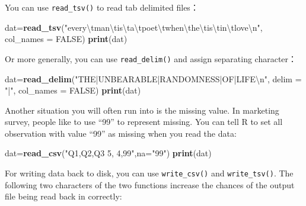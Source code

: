 \documentclass[12pt,]{krantz}
\makeatletter
\newenvironment{Shaded}{\begin{snugshade}}{\end{snugshade}}
\newcommand{\KeywordTok}[1]{\textcolor[rgb]{0.27,0.27,0.27}{\textbf{#1}}}
\newcommand{\DataTypeTok}[1]{\textcolor[rgb]{0.27,0.27,0.27}{#1}}
\newcommand{\CharTok}[1]{\textcolor[rgb]{0.5,0.5,0.5}{#1}}
\newcommand{\StringTok}[1]{\textcolor[rgb]{0.5,0.5,0.5}{#1}}
\newcommand{\OtherTok}[1]{\textcolor[rgb]{0.37,0.37,0.37}{#1}}
\newcommand{\NormalTok}[1]{#1}
\newenvironment{kframe}{%
\medskip{}
\setlength{\fboxsep}{.8em}
 \def\at@end@of@kframe{}%
 \ifinner\ifhmode%
  \def\at@end@of@kframe{\end{minipage}}%
  \begin{minipage}{\columnwidth}%
 \fi\fi%
 \def\FrameCommand##1{\hskip\@totalleftmargin \hskip-\fboxsep
 \colorbox{shadecolor}{##1}\hskip-\fboxsep
     \hskip-\linewidth \hskip-\@totalleftmargin \hskip\columnwidth}%
 \MakeFramed {\advance\hsize-\width
   \@totalleftmargin\z@ \linewidth\hsize
   \@setminipage}}%
 {\par\unskip\endMakeFramed%
 \at@end@of@kframe}
\renewenvironment{Shaded}{\begin{kframe}}{\end{kframe}}
\theoremstyle{definition}
\theoremstyle{definition}
\theoremstyle{definition}
\theoremstyle{remark}
\makeatother
\begin{document}
You can use \texttt{read\_tsv()} to read tab delimited files：

\begin{Shaded}
\begin{Highlighting}[]
\NormalTok{dat=}\KeywordTok{read_tsv}\NormalTok{(}\StringTok{"every}\CharTok{\textbackslash{}t}\StringTok{man}\CharTok{\textbackslash{}t}\StringTok{is}\CharTok{\textbackslash{}t}\StringTok{a}\CharTok{\textbackslash{}t}\StringTok{poet}\CharTok{\textbackslash{}t}\StringTok{when}\CharTok{\textbackslash{}t}\StringTok{he}\CharTok{\textbackslash{}t}\StringTok{is}\CharTok{\textbackslash{}t}\StringTok{in}\CharTok{\textbackslash{}t}\StringTok{love}\CharTok{\textbackslash{}n}\StringTok{"}\NormalTok{, }\DataTypeTok{col_names =} \OtherTok{FALSE}\NormalTok{)}
\KeywordTok{print}\NormalTok{(dat)}
\end{Highlighting}
\end{Shaded}

Or more generally, you can use \texttt{read\_delim()} and assign
separating character：

\begin{Shaded}
\begin{Highlighting}[]
\NormalTok{dat=}\KeywordTok{read_delim}\NormalTok{(}\StringTok{"THE|UNBEARABLE|RANDOMNESS|OF|LIFE}\CharTok{\textbackslash{}n}\StringTok{"}\NormalTok{, }\DataTypeTok{delim =} \StringTok{"|"}\NormalTok{, }\DataTypeTok{col_names =} \OtherTok{FALSE}\NormalTok{)}
\KeywordTok{print}\NormalTok{(dat)}
\end{Highlighting}
\end{Shaded}

Another situation you will often run into is the missing value. In
marketing survey, people like to use ``99'' to represent missing. You
can tell R to set all observation with value ``99'' as missing when you
read the data:

\begin{Shaded}
\begin{Highlighting}[]
\NormalTok{dat=}\KeywordTok{read_csv}\NormalTok{(}\StringTok{"Q1,Q2,Q3}
\StringTok{               5, 4,99"}\NormalTok{,}\DataTypeTok{na=}\StringTok{"99"}\NormalTok{)}
\KeywordTok{print}\NormalTok{(dat)}
\end{Highlighting}
\end{Shaded}

For writing data back to disk, you can use \texttt{write\_csv()} and
\texttt{write\_tsv()}. The following two characters of the two functions
increase the chances of the output file being read back in correctly:
\end{document}
